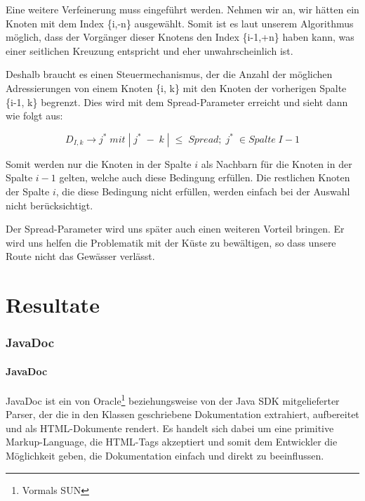 \documentclass[a4paper,10pt]{article}
\begin{document}
Eine weitere Verfeinerung muss eingeführt werden. Nehmen wir an, wir hätten ein
Knoten mit dem Index \{i,-n\} ausgewählt. Somit ist es laut unserem Algorithmus
möglich, dass der Vorgänger dieser Knotens den Index \{i-1,+n\} haben kann, was
einer seitlichen Kreuzung entspricht und eher unwahrscheinlich ist.

Deshalb braucht es einen Steuermechanismus, der die Anzahl der möglichen
Adressierungen von einem Knoten \{i, k\} mit den Knoten der vorherigen Spalte
\{i-1, k\} begrenzt. Dies wird mit dem Spread-Parameter erreicht und sieht dann
wie folgt aus:

\begin{equation}
\label{eq_dyn:7}
D_{I,k} \to j^*\; mit\; |\;j^*\;-\;k\;| \;\le\; Spread;\; j^*\; \in Spalte\; I-1
\end{equation}
 
Somit werden nur die Knoten in der Spalte \(i\) als Nachbarn für die Knoten in
der Spalte \(i-1\) gelten, welche auch diese Bedingung erfüllen. Die restlichen
Knoten der Spalte \(i\), die diese Bedingung nicht erfüllen, werden einfach bei
der Auswahl nicht berücksichtigt.

Der Spread-Parameter wird uns später auch einen weiteren Vorteil bringen. Er
wird uns helfen die Problematik mit der Küste zu bewältigen, so dass
unsere Route nicht das Gewässer verlässt.






\newpage
\part{Resultate}



\section{JavaDoc}

\subsection{JavaDoc}
JavaDoc ist ein von Oracle\footnote{Vormals SUN} beziehungsweise von der Java
SDK mitgelieferter Parser, der die in den Klassen geschriebene Dokumentation
extrahiert, aufbereitet und als HTML-Dokumente rendert. Es handelt sich dabei
um eine primitive Markup-Language, die HTML-Tags akzeptiert und somit dem
Entwickler die Möglichkeit geben, die Dokumentation einfach und direkt zu
beeinflussen.
\end{document}
